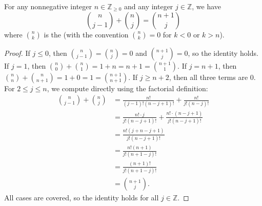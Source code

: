 \begin{lemma} \label{lemma:pascal_identity_for_binomial_coefficients}
    For any nonnegative integer $n \in \mathbb{Z}_{\geq 0}$ and any integer $j \in \mathbb{Z}$, we have
    $$\binom{n}{j-1} + \binom{n}{j} = \binom{n+1}{j}$$
    where $\binom{n}{k}$ is the  (with the convention $\binom{n}{k} = 0$ for $k < 0$ or $k > n$).
\end{lemma}

\begin{proof}
    If $j \leq 0$, then $\binom{n}{j-1} = \binom{n}{j} = 0$ and $\binom{n+1}{j} = 0$, so the identity holds. If $j = 1$, then $\binom{n}{0} + \binom{n}{1} = 1 + n = n+1 = \binom{n+1}{1}$. If $j = n+1$, then $\binom{n}{n} + \binom{n}{n+1} = 1 + 0 = 1 = \binom{n+1}{n+1}$. If $j \geq n+2$, then all three terms are $0$. For $2 \leq j \leq n$, we compute directly using the factorial definition:
    $$\begin{aligned}
        \binom{n}{j-1} + \binom{n}{j} &= \frac{n!}{(j-1)!(n-j+1)!} + \frac{n!}{j!(n-j)!} \\
        &= \frac{n! \cdot j}{j!(n-j+1)!} + \frac{n! \cdot (n-j+1)}{j!(n-j+1)!} \\
        &= \frac{n!(j + n - j + 1)}{j!(n-j+1)!} \\
        &= \frac{n!(n+1)}{j!(n+1-j)!} \\
        &= \frac{(n+1)!}{j!(n+1-j)!} \\
        &= \binom{n+1}{j}.
    \end{aligned}$$
    All cases are covered, so the identity holds for all $j \in \mathbb{Z}$.
\end{proof}